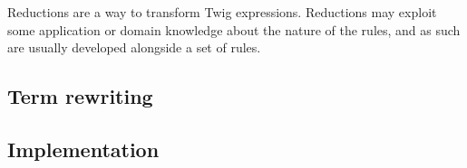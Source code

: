 Reductions are a way to transform Twig expressions. Reductions may exploit
some application or domain knowledge about the nature of the rules, and as
such are usually developed alongside a set of rules.


\subsection{Term rewriting}
\label{section:term-rewriting}


\subsection{Implementation}

